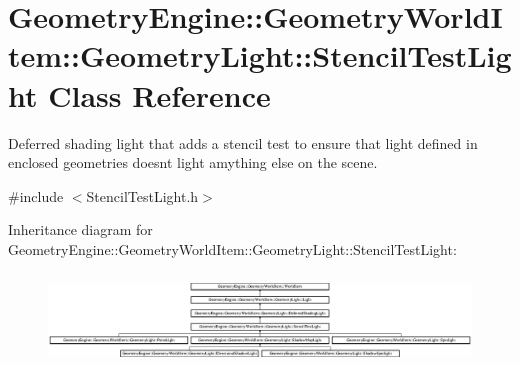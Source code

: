 \hypertarget{class_geometry_engine_1_1_geometry_world_item_1_1_geometry_light_1_1_stencil_test_light}{}\section{Geometry\+Engine\+::Geometry\+World\+Item\+::Geometry\+Light\+::Stencil\+Test\+Light Class Reference}
\label{class_geometry_engine_1_1_geometry_world_item_1_1_geometry_light_1_1_stencil_test_light}


Deferred shading light that adds a stencil test to ensure that light defined in enclosed geometries doesn\textquotesingle{}t light amything else on the scene.  




{\ttfamily \#include $<$Stencil\+Test\+Light.\+h$>$}

Inheritance diagram for Geometry\+Engine\+::Geometry\+World\+Item\+::Geometry\+Light\+::Stencil\+Test\+Light\+:\begin{figure}[H]
\begin{center}
\leavevmode
\includegraphics[height=2.466960cm]{class_geometry_engine_1_1_geometry_world_item_1_1_geometry_light_1_1_stencil_test_light}
\end{center}
\end{figure}

